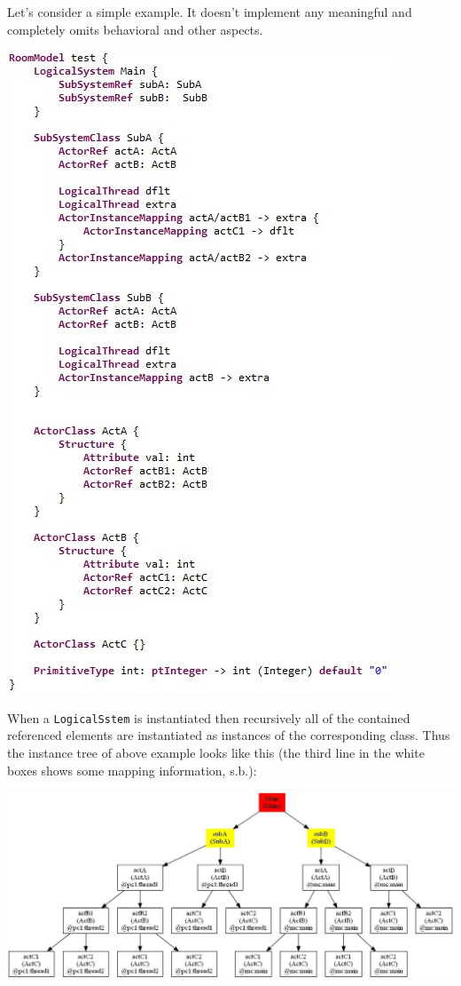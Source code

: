 Let's consider a simple example. It doesn't implement any meaningful and completely omits behavioral and 
other aspects.

\includegraphics{images/080-room.jpg}

When a \texttt{LogicalSstem} is instantiated then recursively all of the contained referenced elements are 
instantiated as instances of the corresponding class. Thus the instance tree of above example looks like 
this (the third line in the white boxes shows some mapping information, s.b.):

\includegraphics[scale=0.45]{images/080-instances.jpg}


